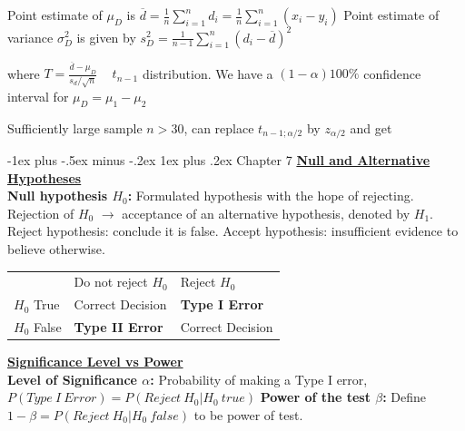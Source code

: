 \documentclass[10pt,landscape]{article}
\makeatletter
\renewcommand{\subsubsection}{\@startsection{subsubsection}{3}{0mm}%
                                {-1ex plus -.5ex minus -.2ex}%
                                {1ex plus .2ex}%
                                {\normalfont\small\bfseries}}
\makeatother
\begin{document}
\begin{multicols*}{3}
Point estimate of $\mu_D$ is $\overline{d}=\frac{1}{n}\sum^n_{i=1}d_i=\frac{1}{n}\sum_{i=1}^n(x_i-y_i)$
Point estimate of variance $\sigma^2_D$ is given by $s_D^2=\frac{1}{n-1}\sum^n_{i=1}(d_i-\overline{d})^2$


where $T=\frac{\overline{d}-\mu_D}{s_d/\sqrt{n}}$ ~ $t_{n-1}$ distribution.
We have a $(1-\alpha)100\%$ confidence interval for $\mu_D=\mu_1-\mu_2$


Sufficiently large sample $n>30$, can replace $t_{n-1;\alpha/2}$ by $z_{\alpha/2}$ and get

\subsubsection{Chapter 7} 
\textbf{\underline{Null and Alternative Hypotheses}} \\ 
\textbf{Null hypothesis $H_0$:} Formulated hypothesis with the hope of rejecting.
Rejection of $H_0$ $\rightarrow$ acceptance of an alternative hypothesis, denoted by $H_1$.
Reject hypothesis: conclude it is false. Accept hypothesis: insufficient evidence to believe otherwise.

{
    \centering
    \begin{tabular}{|l|l|l|}
    \cline{1-3}
                & Do not reject $H_0$       & Reject $H_0$          \\ \cline{1-3}
    $H_0$ True  & Correct Decision          & \textbf{Type I Error} \\ \cline{1-3}
    $H_0$ False & \textbf{Type II Error}    & Correct Decision      \\ \cline{1-3}
    \end{tabular}\par
}
\textbf{\underline{Significance Level vs Power}} \\
\textbf{Level of Significance $\alpha$:} Probability of making a Type I error, $P(Type \ I \ Error) = P(Reject \ H_0 | H_0 \ true)$ 
\textbf{Power of the test $\beta$:} Define $1 - \beta = P(Reject \ H_0 | H_0 \ false)$ to be power of test.


\end{multicols*}
\end{document}
